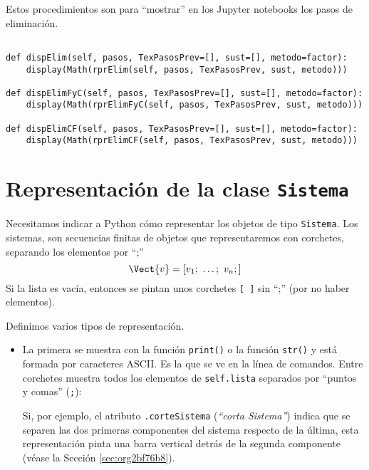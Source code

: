\documentclass[11pt]{report}
\begin{document}
Estos procedimientos son para ``mostrar'' en los Jupyter notebooks los pasos de eliminación.

\begin{verbatim}

def dispElim(self, pasos, TexPasosPrev=[], sust=[], metodo=factor):
    display(Math(rprElim(self, pasos, TexPasosPrev, sust, metodo)))

def dispElimFyC(self, pasos, TexPasosPrev=[], sust=[], metodo=factor):
    display(Math(rprElimFyC(self, pasos, TexPasosPrev, sust, metodo)))

def dispElimCF(self, pasos, TexPasosPrev=[], sust=[], metodo=factor):
    display(Math(rprElimCF(self, pasos, TexPasosPrev, sust, metodo)))

\end{verbatim}

\section{Representación de la clase \texttt{Sistema}}
\label{sec:orgd4628dd}
Necesitamos indicar a Python cómo representar los objetos de tipo
\texttt{Sistema}. Los sistemas, son secuencias finitas de objetos que
representaremos con corchetes, separando los elementos por ``;''
\begin{displaymath}
  \Vect{v}=[v_1;\ \ldots;\ v_n;]
\end{displaymath}
Si la lista es vacía, entonces se pintan unos corchetes \texttt{[ ]} sin
 ``;'' (por no haber elementos). 

Definimos varios tipos de representación.

\begin{itemize}
\item La primera se muestra con la función \texttt{print()} o la función \texttt{str()}
y está formada por caracteres ASCII. Es la que se ve en la línea de
comandos. Entre corchetes muestra todos los elementos de
\texttt{self.lista} separados por ``puntos y comas'' (\texttt{;}):

Si, por ejemplo, el atributo \texttt{.corteSistema} (\emph{``corta Sistema''}) indica que
se separen las dos primeras componentes del sistema respecto de la
última, esta representación pinta una barra vertical detrás de la
segunda componente (véase la Sección \ref{sec:org2bf76b8}).
\end{itemize}
\end{document}
